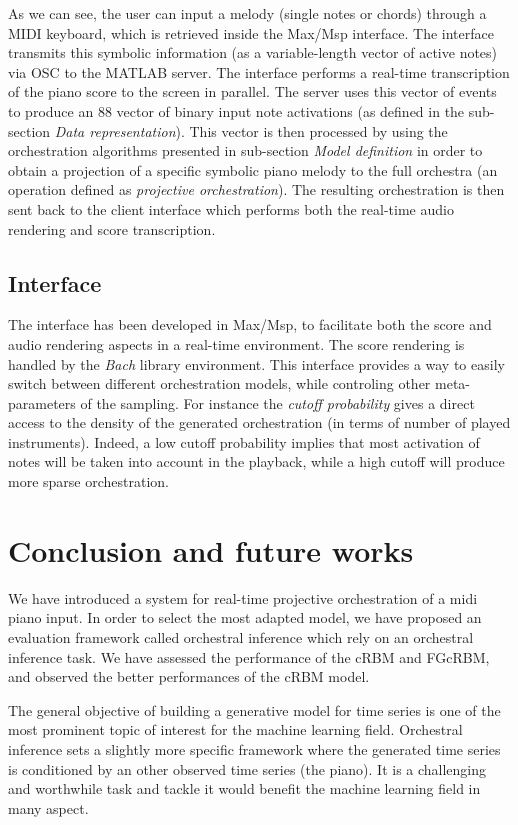 \documentclass[letterpaper]{article}
\begin{document}
As we can see, the user can input a melody (single notes or chords)
through a MIDI keyboard, which is retrieved inside the Max/Msp interface.
The interface transmits this symbolic information (as a variable-length
vector of active notes) via OSC to the MATLAB server. The interface
performs a real-time transcription of the piano score to the screen
in parallel. The server uses this vector of events to produce an 88
vector of binary input note activations (as defined in the sub-section \textit{Data representation}).
This vector is then processed by using the orchestration algorithms
presented in sub-section \textit{Model definition} in order to obtain a projection
of a specific symbolic piano melody to the full orchestra (an operation
defined as \emph{projective orchestration}). The resulting orchestration
is then sent back to the client interface which performs both the
real-time audio rendering and score transcription. 

\subsection{Interface}
The interface has been developed in Max/Msp, to facilitate both the
score and audio rendering aspects in a real-time environment. The
score rendering is handled by the \emph{Bach} library environment. 
This interface provides a way to easily switch between different orchestration models, while controling other
meta-parameters of the sampling. For instance the \emph{cutoff probability
}gives a direct access to the density of the generated orchestration
(in terms of number of played instruments). Indeed, a low cutoff probability
implies that most activation of notes will be taken into account in
the playback, while a high cutoff will produce more sparse orchestration.

\section{Conclusion and future works}
We have introduced a system for real-time projective orchestration of a midi piano input. In order to select the most adapted model, we have proposed an evaluation framework called orchestral inference which rely on an orchestral inference task. We have assessed the performance of the cRBM and FGcRBM, and observed the better performances of the cRBM model.

The general objective of building a generative model for time series is one of the most prominent topic of interest for the machine learning field. Orchestral inference sets a slightly more specific framework where the generated time series is conditioned by an other observed time series (the piano). It is a challenging and worthwhile task and tackle it would benefit the machine learning field in many aspect.
\end{document}
